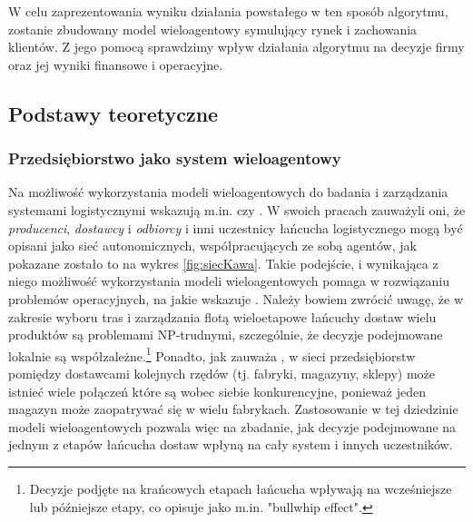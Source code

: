 \documentclass[polish, twoside, 12pt, a4paper]{article}
\theoremstyle{definition}
\theoremstyle{plain}
\theoremstyle{remark}
\begin{document}
W celu zaprezentowania wyniku działania powstałego w ten sposób algorytmu, zostanie zbudowany model wieloagentowy symulujący rynek i zachowania klientów. Z jego pomocą sprawdzimy wpływ działania algorytmu na decyzje firmy oraz jej wyniki finansowe i operacyjne.

\subsection{Podstawy teoretyczne} \label{chapter:teoria}
\subsubsection{Przedsiębiorstwo jako system wieloagentowy} 
Na możliwość wykorzystania modeli wieloagentowych do badania i zarządzania systemami logistycznymi wskazują m.in. \cite{Moyaux2006} czy \cite{Kawa2010}. W swoich pracach zauważyli oni, że  \textit{producenci},  \textit{dostawcy} i  \textit{odbiorcy} i inni uczestnicy łańcucha logistycznego mogą być opisani jako sieć autonomicznych, współpracujących ze sobą agentów, jak pokazane zostało to na wykres \ref{fig:siecKawa}. Takie podejście, i wynikająca z niego możliwość wykorzystania modeli wieloagentowych pomaga w rozwiązaniu problemów operacyjnych, na jakie wskazuje \cite{Kawa2010}. Należy bowiem zwrócić uwagę, że w zakresie wyboru tras i zarządzania flotą wieloetapowe łańcuchy dostaw wielu produktów są problemami NP-trudnymi, szczególnie, że decyzje podejmowane lokalnie są współzależne.\footnote{Decyzje podjęte na krańcowych etapach łańcucha wpływają na wcześniejsze lub późniejsze etapy, co \cite{Moyaux2006} opisuje jako m.in. "bullwhip effect".} Ponadto, jak zauważa \cite{Kawa2010}, w sieci przedsiębiorstw pomiędzy dostawcami kolejnych rzędów (tj. fabryki, magazyny, sklepy) może istnieć wiele połączeń które są wobec siebie konkurencyjne, ponieważ jeden magazyn może zaopatrywać się w wielu fabrykach. Zastosowanie w tej dziedzinie modeli wieloagentowych pozwala więc na zbadanie, jak decyzje podejmowane na jednym z etapów łańcucha dostaw wpłyną na cały system i innych uczestników.  
\end{document}

